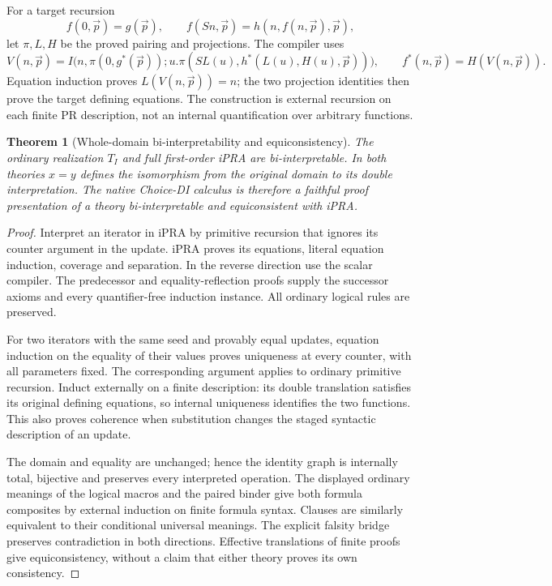 \documentclass[11pt]{article}
\newtheorem{theorem}{Theorem}[section]
\theoremstyle{definition}\newtheorem{definition}[theorem]{Definition}
\begin{document}
For a target recursion
\[
f(0,\vec p)=g(\vec p),\qquad
f(Sn,\vec p)=h(n,f(n,\vec p),\vec p),
\]
let $\pi,L,H$ be the proved pairing and projections. The compiler uses
\[
V(n,\vec p)=I\bigl(n,\pi(0,g^*(\vec p));
u.\pi(SL(u),h^*(L(u),H(u),\vec p))\bigr),
\qquad f^*(n,\vec p)=H(V(n,\vec p)).
\]
Equation induction proves $L(V(n,\vec p))=n$; the two projection
identities then prove the target defining equations. The construction
is external recursion on each finite PR description, not an internal
quantification over arbitrary functions.

\begin{theorem}[Whole-domain bi-interpretability and equiconsistency]
The ordinary realization $T_I$ and full first-order iPRA are
bi-interpretable. In both theories $x=y$ defines the isomorphism from
the original domain to its double interpretation. The native Choice-DI
calculus is therefore a faithful proof presentation of a theory
bi-interpretable and equiconsistent with iPRA.
\end{theorem}
\begin{proof}
Interpret an iterator in iPRA by primitive recursion that ignores its
counter argument in the update. iPRA proves its equations, literal
equation induction, coverage and separation. In the reverse direction
use the scalar compiler. The predecessor and equality-reflection proofs
supply the successor axioms and every quantifier-free induction instance.
All ordinary logical rules are preserved.

For two iterators with the same seed and provably equal updates,
equation induction on the equality of their values proves uniqueness at
every counter, with all parameters fixed. The corresponding argument
applies to ordinary primitive recursion. Induct externally on a finite
description: its double translation satisfies its original defining
equations, so internal uniqueness identifies the two functions. This
also proves coherence when substitution changes the staged syntactic
description of an update.

The domain and equality are unchanged; hence the identity graph is
internally total, bijective and preserves every interpreted operation.
The displayed ordinary meanings of the logical macros and the paired
binder give both formula composites by external induction on finite
formula syntax. Clauses are similarly equivalent to their conditional
universal meanings. The explicit falsity bridge preserves contradiction
in both directions. Effective translations of finite proofs give
equiconsistency, without a claim that either theory proves its own
consistency.
\end{proof}
\end{document}
